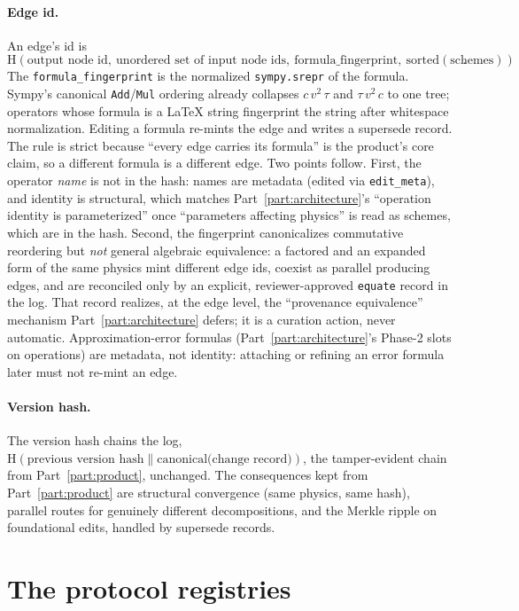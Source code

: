 \documentclass[11pt,a4paper]{article}
\begin{document}
\paragraph{Edge id.} An edge's id is
\[
  \mathrm{H}(\text{output node id},\ \text{unordered set of input node ids},\ \text{formula\_fingerprint},\ \mathrm{sorted}(\text{schemes})).
\]
The \texttt{formula\_fingerprint} is the normalized \texttt{sympy.srepr} of the
formula. Sympy's canonical \texttt{Add}/\texttt{Mul} ordering already collapses
$c\,v^2\,\tau$ and $\tau\,v^2\,c$ to one tree; operators whose formula is a LaTeX
string fingerprint the string after whitespace normalization. Editing a formula
re-mints the edge and writes a supersede record. The rule is strict because ``every
edge carries its formula'' is the product's core claim, so a different formula is a
different edge. Two points follow. First, the operator \emph{name} is not in the
hash: names are metadata (edited via \texttt{edit\_meta}), and identity is
structural, which matches Part~\ref{part:architecture}'s ``operation identity is
parameterized'' once ``parameters affecting physics'' is read as schemes, which
are in the hash. Second, the fingerprint canonicalizes commutative reordering but
\emph{not} general algebraic equivalence: a factored and an expanded form of the
same physics mint different edge ids, coexist as parallel producing edges, and are
reconciled only by an explicit, reviewer-approved \texttt{equate} record in the
log. That record realizes, at the edge level, the ``provenance equivalence''
mechanism Part~\ref{part:architecture} defers; it is a curation action, never
automatic. Approximation-error formulas (Part~\ref{part:architecture}'s Phase-2
slots on operations) are metadata, not identity: attaching or refining an error
formula later must not re-mint an edge.

\paragraph{Version hash.} The version hash chains the log,
$\mathrm{H}(\text{previous version hash} \parallel \text{canonical(change record)})$,
the tamper-evident chain from Part~\ref{part:product}, unchanged. The consequences
kept from Part~\ref{part:product} are structural convergence (same physics, same
hash), parallel routes for genuinely different decompositions, and the Merkle
ripple on foundational edits, handled by supersede records.

\section{The protocol registries}
\label{sec:kernel-registries}
\end{document}

